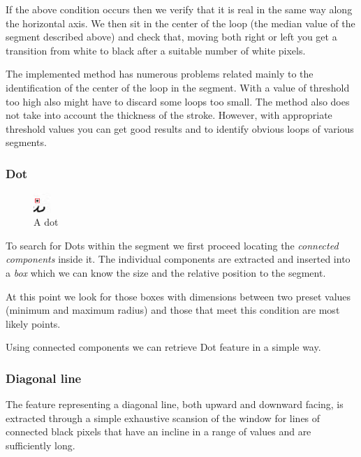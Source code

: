 If the above condition occurs then we verify that it is real in the same way along the horizontal axis. We then sit in the center of the loop (the median value of the segment described above) and check that, moving both right or left you get a transition from white to black after a suitable number of white pixels.

The implemented method has numerous problems related mainly to the identification of the center of the loop in the segment. With a value of threshold too high also might have to discard some loops too small. The method also does not take into account the thickness of the stroke.
However, with appropriate threshold values you can get good results and to identify obvious loops of various segments.

\subsubsection{Dot}

\begin{figure}
  \vspace{-20pt}
  \begin{center}
    \includegraphics[width=0.06\textwidth]{images/dot}
  \end{center}
  \vspace{-20pt}
  \caption{A dot}
  \vspace{-10pt}
\end{figure}

To search for Dots within the segment we first proceed locating the \emph{connected components} inside it. The individual components are extracted and inserted into a \emph{box} which we can know the size and the relative position to the segment.


At this point we look for those boxes with dimensions between two preset values (minimum and maximum radius) and those that meet this condition are most likely points.

Using connected components we can retrieve Dot feature in a simple way.

\subsubsection{Diagonal line}

The feature representing a diagonal line, both upward and downward facing, is extracted through a simple exhaustive scansion of the window for lines of connected black pixels that have an incline in a range of values and are sufficiently long.

